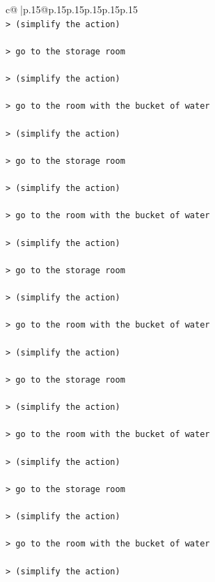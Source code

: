 \documentclass{article}
\begin{document}
{\begin{supertabular}{c@{$\;$}|p{.15\linewidth}@{}p{.15\linewidth}p{.15\linewidth}p{.15\linewidth}p{.15\linewidth}p{.15\linewidth}}
{{{\\ 
\texttt{> (simplify the action) } \\
\\ 
\texttt{> go to the storage room } \\
\\ 
\texttt{> (simplify the action) } \\
\\ 
\texttt{> go to the room with the bucket of water } \\
\\ 
\texttt{> (simplify the action) } \\
\\ 
\texttt{> go to the storage room } \\
\\ 
\texttt{> (simplify the action) } \\
\\ 
\texttt{> go to the room with the bucket of water } \\
\\ 
\texttt{> (simplify the action) } \\
\\ 
\texttt{> go to the storage room } \\
\\ 
\texttt{> (simplify the action) } \\
\\ 
\texttt{> go to the room with the bucket of water } \\
\\ 
\texttt{> (simplify the action) } \\
\\ 
\texttt{> go to the storage room } \\
\\ 
\texttt{> (simplify the action) } \\
\\ 
\texttt{> go to the room with the bucket of water } \\
\\ 
\texttt{> (simplify the action) } \\
\\ 
\texttt{> go to the storage room } \\
\\ 
\texttt{> (simplify the action) } \\
\\ 
\texttt{> go to the room with the bucket of water } \\
\\ 
\texttt{> (simplify the action) } \\
}}}
\end{supertabular}}
\end{document}
